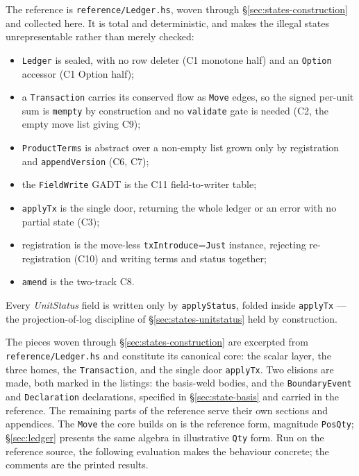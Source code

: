 The reference is \texttt{reference/Ledger.hs}, woven through \S\ref{sec:states-construction} and
collected here. It is total and deterministic, and makes the illegal states unrepresentable
rather than merely checked:
\begin{itemize}[nosep]
\item \texttt{Ledger} is sealed, with no row deleter (C1 monotone half) and an
\texttt{Option} accessor (C1 Option half);
\item a \texttt{Transaction} carries its conserved flow as \texttt{Move} edges, so the
signed per-unit sum is \texttt{mempty} by construction and no \texttt{validate} gate is
needed (C2, the empty move list giving C9);
\item \texttt{ProductTerms} is abstract over a non-empty list grown only by registration
and \texttt{appendVersion} (C6, C7);
\item the \texttt{FieldWrite} GADT is the C11 field-to-writer table;
\item \texttt{applyTx} is the single door, returning the whole ledger or an error with no
partial state (C3);
\item registration is the move-less \texttt{txIntroduce}=\texttt{Just} instance, rejecting
re-registration (C10) and writing terms and status together;
\item \texttt{amend} is the two-track C8.
\end{itemize}
Every \emph{UnitStatus} field is written only by \texttt{applyStatus}, folded inside
\texttt{applyTx} --- the projection-of-log discipline of \S\ref{sec:states-unitstatus} held
by construction.

The pieces woven through \S\ref{sec:states-construction} are excerpted from
\texttt{reference/Ledger.hs} and constitute its canonical core: the scalar layer, the
three homes, the \texttt{Transaction}, and the single door \texttt{applyTx}. Two elisions
are made, both marked in the listings: the basis-weld bodies, and the
\texttt{BoundaryEvent} and \texttt{Declaration} declarations, specified in
\S\ref{sec:state-basis} and carried in the reference. The remaining parts of the
reference serve their own sections and appendices. The \texttt{Move} the core builds on
is the reference form, magnitude \texttt{PosQty}; \S\ref{sec:ledger} presents the same
algebra in illustrative \texttt{Qty} form. Run on the reference source, the following
evaluation makes the behaviour concrete; the comments are the printed results.


